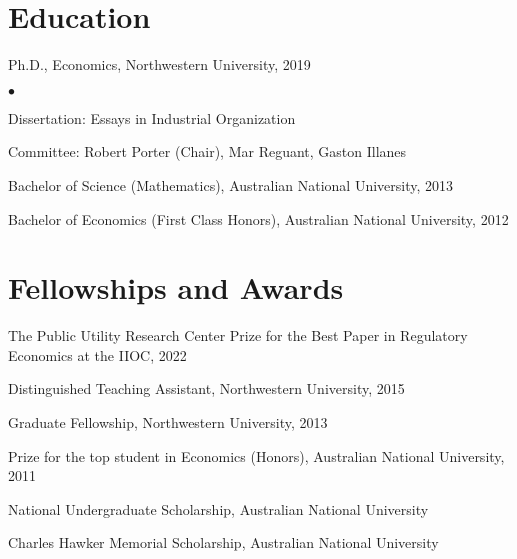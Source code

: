 \documentclass[margin,line]{res}
\newenvironment{list1}{
  \begin{list}{\ding{113}}{%
      \setlength{\itemsep}{.025in}
      \setlength{\parsep}{0in} \setlength{\parskip}{0in}
      \setlength{\topsep}{0in} \setlength{\partopsep}{0in}
      \setlength{\leftmargin}{0.17in}}}{\end{list}}
\newenvironment{list2}{
  \begin{list}{$\bullet$}{%
      \setlength{\itemsep}{0in}
      \setlength{\parsep}{0in} \setlength{\parskip}{0in}
      \setlength{\topsep}{0in} \setlength{\partopsep}{0in}
      \setlength{\leftmargin}{0.2in}}}{\end{list}}
\begin{document}
\begin{resume}
\section{ Education}\begin{tiny}

\end{tiny}
\begin{list1}
\item[] Ph.D., Economics, Northwestern University, 2019
	\begin{list2}
		\item[] Dissertation: Essays in Industrial Organization
		\item[] Committee: Robert Porter (Chair), Mar Reguant, Gaston Illanes
	\end{list2}
\item[] Bachelor of Science (Mathematics), Australian National University, 2013
\item[] Bachelor of Economics (First Class Honors), Australian National University, 2012
\end{list1}

\section{Fellowships and Awards}
\begin{list1}
\item[] The Public Utility Research Center Prize for the Best Paper in Regulatory Economics at the IIOC, 2022
\item[] Distinguished Teaching Assistant, Northwestern University, 2015
\item[] Graduate Fellowship, Northwestern University, 2013
\item[] Prize for the top student in Economics (Honors), Australian National University, 2011
\item[] National Undergraduate Scholarship, Australian National University
\item[] Charles Hawker Memorial Scholarship, Australian National University
\end{list1}


\end{resume}
\end{document}

